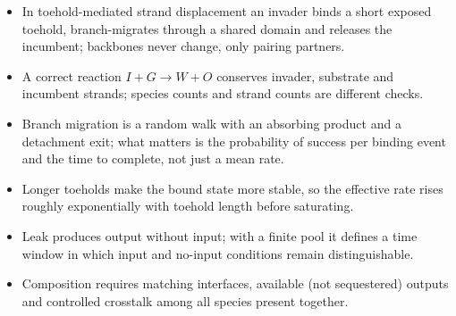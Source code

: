 \begin{KeyIdeas}
\begin{itemize}\setlength{\itemsep}{2pt}
\item In toehold-mediated strand displacement an invader binds a short exposed
toehold, branch-migrates through a shared domain and releases the incumbent;
backbones never change, only pairing partners.
\item A correct reaction $I+G\to W+O$ conserves invader, substrate and incumbent
strands; species counts and strand counts are different checks.
\item Branch migration is a random walk with an absorbing product and a
detachment exit; what matters is the probability of success per binding event
and the time to complete, not just a mean rate.
\item Longer toeholds make the bound state more stable, so the effective rate
rises roughly exponentially with toehold length before saturating.
\item Leak produces output without input; with a finite pool it defines a time
window in which input and no-input conditions remain distinguishable.
\item Composition requires matching interfaces, available (not sequestered)
outputs and controlled crosstalk among all species present together.
\end{itemize}
\end{KeyIdeas}

